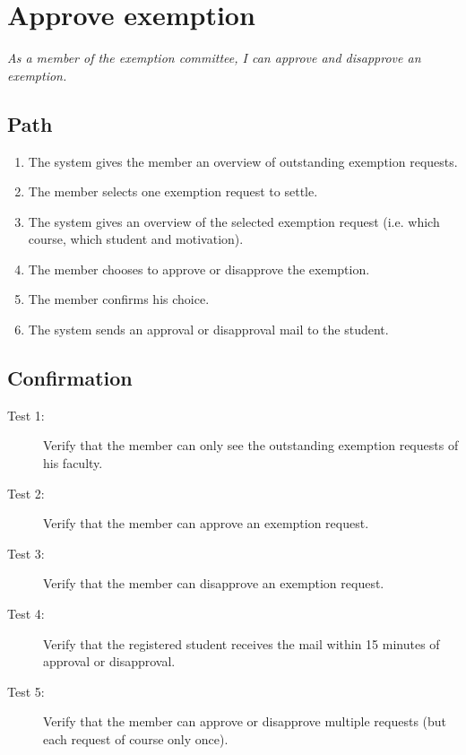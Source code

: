 \section{Approve exemption}

\par \emph{As a member of the exemption committee, I can approve and disapprove an exemption.}

\subsection{Path}

\begin{enumerate}
  \item The system gives the member an overview of outstanding exemption
  requests.
  \item The member selects one exemption request to settle.
  \item The system gives an overview of the selected exemption request (i.e.
  which course, which student and motivation).
  \item The member chooses to approve or disapprove the exemption.
  \item The member confirms his choice.
  \item The system sends an approval or disapproval mail to the student.
\end{enumerate}

\subsection{Confirmation}

\begin{description}
\item[Test 1:] Verify that the member can only see the outstanding exemption
requests of his faculty.
\item[Test 2:] Verify that the member can approve an exemption request.
\item[Test 3:] Verify that the member can disapprove an exemption request.
\item[Test 4:] Verify that the registered student receives the mail within 15
minutes of approval or disapproval.
\item[Test 5:] Verify that the member can approve or disapprove multiple
requests (but each request of course only once).
\end{description}
